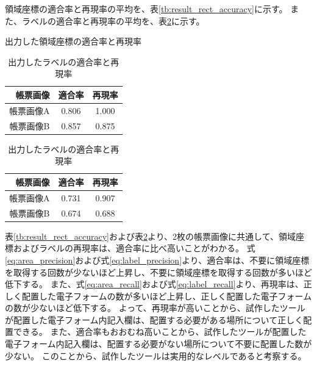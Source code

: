 領域座標の適合率と再現率の平均を、表\ref{tb:result_rect_accuracy}に示す。
また、ラベルの適合率と再現率の平均を、表\ref{tb:result_label_accuracy}に示す。
\begin{table}[tp]
    \centering
    \begin{minipage}[h]{0.47\linewidth}
        \caption{出力した領域座標の適合率と再現率}
        \label{tb:result_rect_accuracy}
        \centering
        \begin{tabular}{r|c|c}
            帳票画像 & 適合率 & 再現率 \\
            \hline \hline
            帳票画像A & 0.806 & 1.000 \\
            帳票画像B & 0.857 & 0.875 \\
        \end{tabular}
    \end{minipage}
    \begin{minipage}[h]{0.47\linewidth}
        \caption{出力したラベルの適合率と再現率}
        \label{tb:result_label_accuracy}
        \centering
        \begin{tabular}{r|c|c}
            帳票画像 & 適合率 & 再現率 \\
            \hline \hline
            帳票画像A & 0.731 & 0.907 \\
            帳票画像B & 0.674 & 0.688 \\
        \end{tabular}
    \end{minipage}
\end{table}
表\ref{tb:result_rect_accuracy}および表\ref{tb:result_label_accuracy}より、2枚の帳票画像に共通して、領域座標およびラベルの再現率は、適合率に比べ高いことがわかる。
式\ref{eq:area_precision}および式\ref{eq:label_precision}より、適合率は、不要に領域座標を取得する回数が少ないほど上昇し、不要に領域座標を取得する回数が多いほど低下する。
また、式\ref{eq:area_recall}および式\ref{eq:label_recall}より、再現率は、正しく配置した電子フォームの数が多いほど上昇し、正しく配置した電子フォームの数が少ないほど低下する。
よって、再現率が高いことから、試作したツールが配置した電子フォーム内記入欄は、配置する必要がある場所について正しく配置できる。
また、適合率もおおむね高いことから、試作したツールが配置した電子フォーム内記入欄は、配置する必要がない場所について不要に配置した数が少ない。
このことから、試作したツールは実用的なレベルであると考察する。

